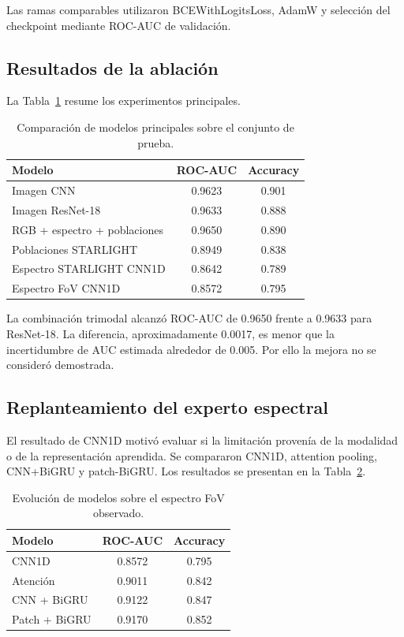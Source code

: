 \documentclass[letterpaper,11pt]{article}
\begin{document}
Las ramas comparables utilizaron BCEWithLogitsLoss, AdamW y selección del checkpoint mediante ROC-AUC de validación. 

\subsection{Resultados de la ablación} 

La Tabla~\ref{tab:ablacion} resume los experimentos principales.

\begin{table}[H] 
  \centering 
  \caption{Comparación de modelos principales sobre el conjunto de prueba.} 
  \label{tab:ablacion}

  \begin{tabular}{lcc} 
    \toprule Modelo & ROC-AUC & Accuracy\\ 
    \midrule Imagen CNN & 0.9623 & 0.901\\ 
    Imagen ResNet-18 & 0.9633 & 0.888\\ 
    RGB + espectro + poblaciones & 0.9650 & 0.890\\ 
    Poblaciones STARLIGHT & 0.8949 & 0.838\\ 
    Espectro STARLIGHT CNN1D & 0.8642 & 0.789\\ 
    Espectro FoV CNN1D & 0.8572 & 0.795\\ 
    \bottomrule 
  \end{tabular}

\end{table}

La combinación trimodal alcanzó ROC-AUC de 0.9650 frente a 0.9633 para ResNet-18. La diferencia, aproximadamente 0.0017, es menor que la incertidumbre de AUC estimada alrededor de 0.005. Por ello la mejora no se consideró demostrada. 

\subsection{Replanteamiento del experto espectral}

El resultado de CNN1D motivó evaluar si la limitación provenía de la modalidad o de la representación aprendida. Se compararon CNN1D, attention pooling, CNN+BiGRU y patch-BiGRU. Los resultados se presentan en la Tabla~\ref{tab:espectro}.

\begin{table}[H] 
  \centering 
  \caption{Evolución de modelos sobre el espectro FoV observado.} 
  \label{tab:espectro}

  \begin{tabular}{lcc} 
    \toprule Modelo & ROC-AUC & Accuracy\\ 
    \midrule CNN1D & 0.8572 & 0.795\\ 
    Atención & 0.9011 & 0.842\\ 
    CNN + BiGRU & 0.9122 & 0.847\\ 
    Patch + BiGRU & 0.9170 & 0.852\\ 
    \bottomrule 
  \end{tabular}

\end{table} 
\end{document}
